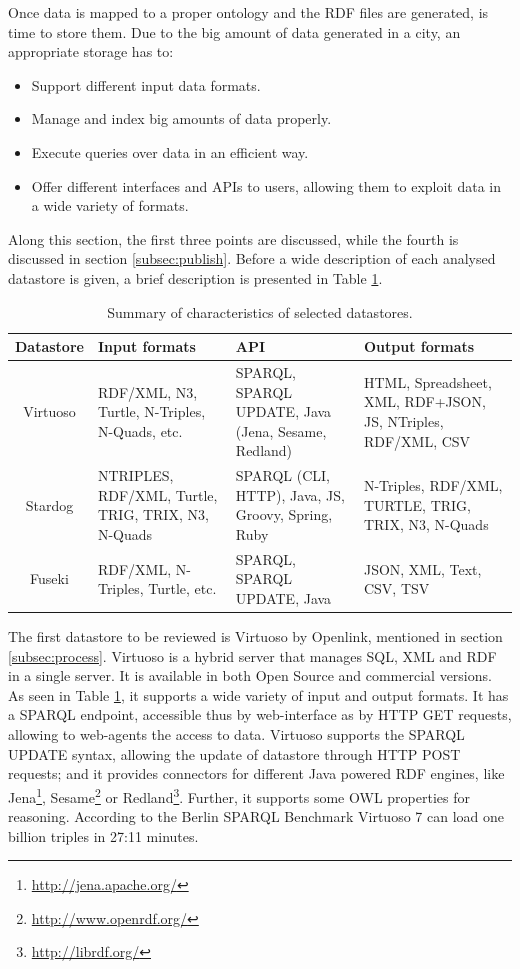 Once data is mapped to a proper ontology and the RDF files are generated, is time to store them. Due to the big amount of data generated in a city, an appropriate storage has to:

\begin{itemize}
    \item Support different input data formats.
    \item Manage and index big amounts of data properly.
    \item Execute queries over data in an efficient way.
    \item Offer different interfaces and APIs to users, allowing them to exploit data in a wide variety of formats.
\end{itemize}

Along this section, the first three points are discussed, while the fourth is discussed in section \ref{subsec:publish}. Before a wide description of each analysed datastore is given, a brief description is presented in Table \ref{tab:datastores}.

\begin{table}
    \center{}
    \caption{Summary of characteristics of selected datastores.}
    \begin{tabular}{|c|p{2.8cm}|p{2.8cm}|p{2.8cm}|}
        \hline
        \textbf{Datastore} & \textbf{Input formats} & \textbf{API} & \textbf{Output formats} \\
        \hline \hline
        Virtuoso & RDF/XML, N3, Turtle, N-Triples, N-Quads, etc. & SPARQL, SPARQL UPDATE, Java (Jena, Sesame, Redland) & HTML, Spreadsheet, XML, RDF+JSON, JS, NTriples, RDF/XML, CSV \\
        \hline
        Stardog & NTRIPLES, RDF/XML, Turtle, TRIG, TRIX, N3, N-Quads & SPARQL (CLI, HTTP), Java, JS, Groovy, Spring, Ruby & N-Triples, RDF/XML, TURTLE, TRIG, TRIX, N3, N-Quads \\
        \hline
        Fuseki & RDF/XML, N-Triples, Turtle, etc. & SPARQL, SPARQL UPDATE, Java & JSON, XML, Text, CSV, TSV \\
        \hline
    \end{tabular}
    \label{tab:datastores}
\end{table}

The first datastore to be reviewed is Virtuoso by Openlink, mentioned in section \ref{subsec:process}. Virtuoso is a hybrid server that manages SQL, XML and RDF in a single server. It is available in both Open Source and commercial versions. As seen in Table \ref{tab:datastores}, it supports a wide variety of input and output formats. It has a SPARQL endpoint, accessible thus by web-interface as by HTTP GET requests, allowing to web-agents the access to data. Virtuoso supports the SPARQL UPDATE syntax, allowing the update of datastore through HTTP POST requests; and it provides connectors for different Java powered RDF engines, like Jena\footnote{\url{http://jena.apache.org/}}, Sesame\footnote{\url{http://www.openrdf.org/}} or Redland\footnote{\url{http://librdf.org/}}. Further, it supports some OWL properties for reasoning. According to the Berlin SPARQL Benchmark \cite{bizer2009berlin} Virtuoso 7 can load one billion triples in 27:11 minutes.

